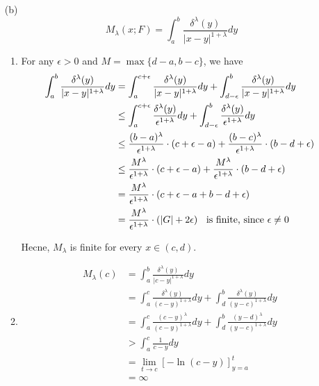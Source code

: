 \documentclass[a4paper,11pt]{article}
\begin{document}
\begin{enumerate}
\begin{enumerate}
 			\item [(b)]
 				$$M_\lambda(x;F) = \int_a^b \frac{\delta^\lambda(y)}{|x-y|^{1+\lambda}} dy$$
 				\begin{enumerate}
 					\item
 						For any $\epsilon > 0$ and $M = \max{\{ d-a, b-c \}}$, we have
 						$$\begin{aligned}
 						\int_a^b \frac{\delta^\lambda (y)}{|x - y|^{1 + \lambda}} dy
 						&= \int_{a}^{c + \epsilon} \frac{\delta^\lambda (y)}{|x - y|^{1 + \lambda}} dy + \int_{d - \epsilon}^{b} \frac{\delta^\lambda (y)}{|x - y|^{1 + \lambda}} dy\\
 						&\leq \int_{a}^{c + \epsilon} \frac{\delta^\lambda (y)}{\epsilon^{1 + \lambda}} dy + \int_{d - \epsilon}^{b} \frac{\delta^\lambda (y)}{\epsilon^{1 + \lambda}} dy\\
 						&\leq \frac{(b-a)^\lambda}{\epsilon^{1+\lambda}} \cdot (c + \epsilon - a) + \frac{(b-c)^\lambda}{\epsilon^{1+\lambda}} \cdot (b - d + \epsilon)\\
 						&\leq \frac{M^\lambda}{\epsilon^{1+\lambda}} \cdot (c + \epsilon - a) + \frac{M^\lambda}{\epsilon^{1+\lambda}} \cdot (b - d + \epsilon)\\
 						&= \frac{M^\lambda}{\epsilon^{1+\lambda}} \cdot (c + \epsilon - a + b - d + \epsilon)\\
 						&= \frac{M^\lambda}{\epsilon^{1+\lambda}} \cdot (|G| + 2\epsilon) \hspace{0.2cm} \mbox{ is finite, since $\epsilon \neq 0$}
 						\end{aligned}$$

 						Hecne, $M_{\lambda}$ is finite for every $x \in (c,d)$.\\

					\item
						$$\begin{aligned}
						M_\lambda (c)
						&= \int_a^b \frac{\delta^\lambda (y)}{|c - y|^{1+\lambda}} dy\\
						&= \int_a^c \frac{\delta^\lambda (y)}{(c - y)^{1+\lambda}} dy + \int_d^b \frac{\delta^\lambda (y)}{(y - c)^{1+\lambda}} dy\\
						&= \int_a^c \frac{(c-y)^\lambda}{(c-y)^{1+\lambda}} dy + \int_d^b \frac{(y-d)^{\lambda}}{(y-c)^{1+\lambda}}dy\\
						&> \int_a^c \frac{1}{c-y} dy\\
						&= \underset{t \to c}{\lim} \left[ - \ln (c-y) \right]_{y=a}^{t}\\
						&= \infty
						\end{aligned}$$


\end{enumerate}
\end{enumerate}
\end{enumerate}
\end{document}
